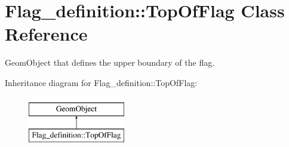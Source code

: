 \hypertarget{classFlag__definition_1_1TopOfFlag}{}\section{Flag\+\_\+definition\+:\+:Top\+Of\+Flag Class Reference}
\label{classFlag__definition_1_1TopOfFlag}


Geom\+Object that defines the upper boundary of the flag.  


Inheritance diagram for Flag\+\_\+definition\+:\+:Top\+Of\+Flag\+:\begin{figure}[H]
\begin{center}
\leavevmode
\includegraphics[height=2.000000cm]{classFlag__definition_1_1TopOfFlag}
\end{center}
\end{figure}
